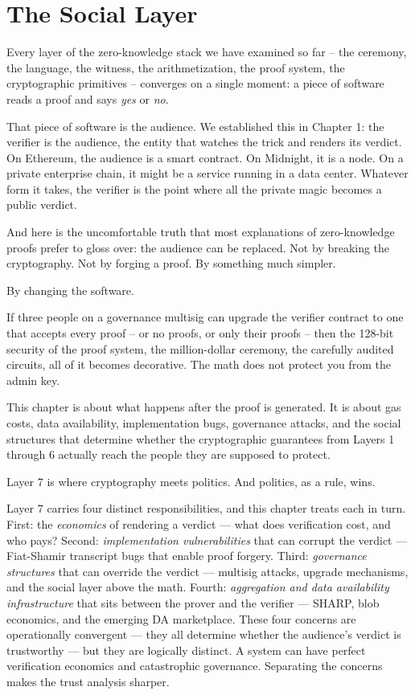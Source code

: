 \documentclass[
  11pt,
  openany]{report}
\begin{document}
\section{The Social Layer}\label{the-social-layer}

Every layer of the zero-knowledge stack we have examined so far -- the ceremony,
the language, the witness, the arithmetization, the proof system, the
cryptographic primitives -- converges on a single moment: a piece of software
reads a proof and says \emph{yes} or \emph{no}.

That piece of software is the audience. We established this in Chapter 1: the
verifier is the audience, the entity that watches the trick and renders its
verdict. On Ethereum, the audience is a smart contract. On Midnight, it is a
node. On a private enterprise chain, it might be a service running in a data
center. Whatever form it takes, the verifier is the point where all the private
magic becomes a public verdict.

And here is the uncomfortable truth that most explanations of zero-knowledge
proofs prefer to gloss over: the audience can be replaced. Not by breaking the
cryptography. Not by forging a proof. By something much simpler.

By changing the software.

If three people on a governance multisig can upgrade the verifier contract to
one that accepts every proof -- or no proofs, or only their proofs -- then the
128-bit security of the proof system, the million-dollar ceremony, the carefully
audited circuits, all of it becomes decorative. The math does not protect you
from the admin key.

This chapter is about what happens after the proof is generated. It is about gas
costs, data availability, implementation bugs, governance attacks, and the
social structures that determine whether the cryptographic guarantees from
Layers 1 through 6 actually reach the people they are supposed to protect.

Layer 7 is where cryptography meets politics. And politics, as a rule, wins.

Layer 7 carries four distinct responsibilities, and this chapter treats each in
turn. First: the \emph{economics} of rendering a verdict --- what does
verification cost, and who pays? Second: \emph{implementation vulnerabilities}
that can corrupt the verdict --- Fiat-Shamir transcript bugs that enable proof
forgery. Third: \emph{governance structures} that can override the verdict ---
multisig attacks, upgrade mechanisms, and the social layer above the math.
Fourth: \emph{aggregation and data availability infrastructure} that sits
between the prover and the verifier --- SHARP, blob economics, and the emerging
DA marketplace. These four concerns are operationally convergent --- they all
determine whether the audience's verdict is trustworthy --- but they are
logically distinct. A system can have perfect verification economics and
catastrophic governance. Separating the concerns makes the trust analysis
sharper.
\end{document}
